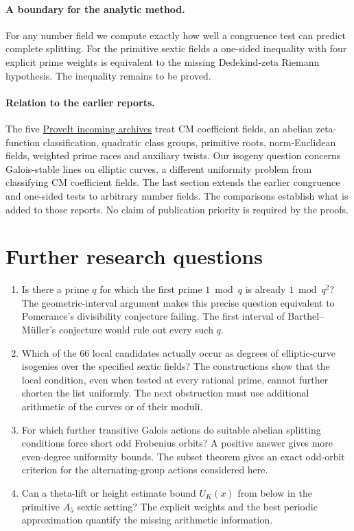 \documentclass[11pt,letterpaper]{article}
\begin{document}
\paragraph{A boundary for the analytic method.}
For any number field we compute exactly how well a congruence test can predict
complete splitting. For the primitive sextic fields a one-sided inequality
with four explicit prime weights is equivalent to the missing Dedekind-zeta
Riemann hypothesis. The inequality remains to be proved.

\paragraph{Relation to the earlier reports.}
The five \href{https://github.com/VladimirReshetnikov/ProveIt/tree/a92443f00663b1b8b3c233d17df0ad49dc4f2b2c/docs/incoming}{ProveIt incoming archives}
treat CM coefficient fields, an abelian zeta-function classification, quadratic
class groups, primitive roots, norm-Euclidean fields, weighted prime races and auxiliary twists.
Our isogeny question concerns Galois-stable lines on elliptic curves, a
different uniformity problem from classifying CM coefficient fields. The
last section extends the earlier congruence and one-sided tests to arbitrary
number fields. The comparisons establish what is added to those reports.
No claim of publication priority is required by the proofs.
\clearpage










\section{Further research questions}
\begin{enumerate}
\item Is there a prime $q$ for which the first prime $1\bmod q$ is already
$1\bmod q^2$? The geometric-interval argument makes this precise question
equivalent to Pomerance's divisibility conjecture failing. The first interval
of Barthel--M\"uller's conjecture would rule out every such $q$.
\item Which of the $66$ local candidates actually occur as degrees of
elliptic-curve isogenies over the specified sextic fields? The constructions
show that the local condition, even when tested at every rational prime,
cannot further shorten the list uniformly. The next obstruction must use
additional arithmetic of the curves or of their moduli.
\item For which further transitive Galois actions do suitable abelian
splitting conditions force short odd Frobenius orbits? A positive answer
gives more even-degree uniformity bounds. The subset theorem gives an exact odd-orbit criterion for the alternating-group actions considered here.
\item Can a theta-lift or height estimate bound $U_K(x)$ from below in
the primitive $A_5$ sextic setting? The explicit weights and the best
periodic approximation quantify the missing arithmetic information.
\end{enumerate}
\end{document}
